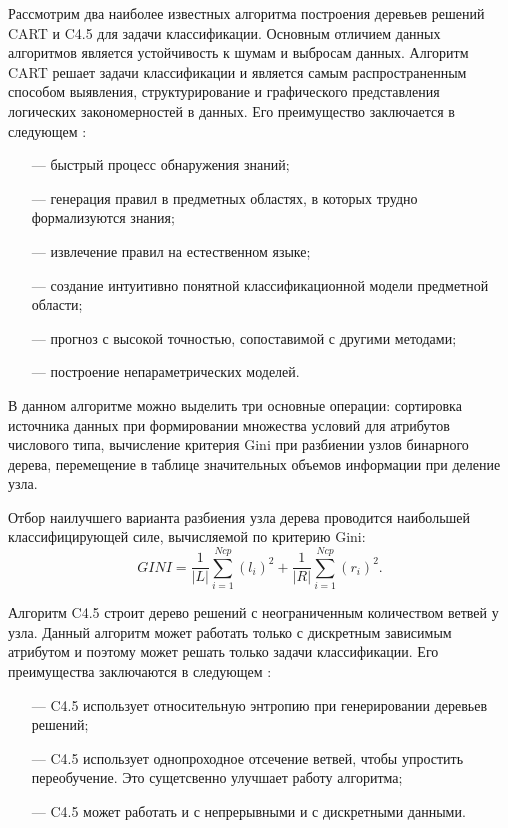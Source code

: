 Рассмотрим два наиболее известных алгоритма построения деревьев решений CART и C4.5 для задачи классификации. Основным отличием данных алгоритмов является устойчивость к шумам и выбросам данных. Алгоритм CART решает задачи классификации и является самым распространенным способом выявления, структурирование и графического представления логических закономерностей в данных. Его преимущество заключается в следующем \cite{tree2}:
\begin{itemize}
	\item[---] быстрый процесс обнаружения знаний;
	\item[---] генерация правил в предметных областях, в которых трудно  формализуются знания;
	\item[---] извлечение правил на естественном языке;
	\item[---] создание интуитивно понятной классификационной модели предметной области;
	\item[---] прогноз с высокой точностью, сопоставимой с другими методами;
	\item[---] построение непараметрических моделей.
\end{itemize}
В данном алгоритме можно выделить три основные операции: сортировка источника данных при формировании множества условий для атрибутов числового типа, вычисление критерия Gini при разбиении узлов бинарного дерева, перемещение в таблице значительных объемов информации при деление узла.

Отбор наилучшего варианта разбиения узла дерева проводится наибольшей классифицирующей силе, вычисляемой по критерию Gini:
\begin{equation}
	GINI =  \frac{1}{|L|}\sum\limits_{i=1}^{Ncp}(l_{i})^2 + \frac{1}{|R|}\sum\limits_{i=1}^{Ncp}(r_{i})^2.
\end{equation}

Алгоритм C4.5 строит дерево решений с неограниченным количеством ветвей у узла. Данный алгоритм может работать только с дискретным зависимым атрибутом и поэтому может решать только задачи классификации.
Его преимущества заключаются в следующем \cite{tree2}:
\begin{itemize}
	\item[---]  C4.5 использует относительную энтропию при генерировании деревьев решений;
	\item[---] C4.5 использует однопроходное отсечение ветвей, чтобы упростить переобучение. Это сущетсвенно улучшает работу алгоритма;
	\item[---]  C4.5 может работать  и с непрерывными и с дискретными данными.
\end{itemize}



